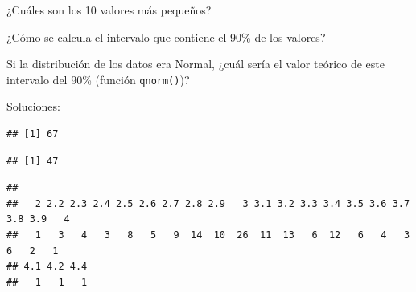 \documentclass[
]{book}
\newenvironment{Shaded}{\begin{snugshade}}{\end{snugshade}}
\newcommand{\DecValTok}[1]{\textcolor[rgb]{0.00,0.00,0.81}{#1}}
\newcommand{\FloatTok}[1]{\textcolor[rgb]{0.00,0.00,0.81}{#1}}
\newcommand{\KeywordTok}[1]{\textcolor[rgb]{0.13,0.29,0.53}{\textbf{#1}}}
\newcommand{\NormalTok}[1]{#1}
\newcommand{\OperatorTok}[1]{\textcolor[rgb]{0.81,0.36,0.00}{\textbf{#1}}}
\newcommand{\StringTok}[1]{\textcolor[rgb]{0.31,0.60,0.02}{#1}}
\begin{document}
¿Cuáles son los 10 valores más pequeños?

¿Cómo se calcula el intervalo que contiene el 90\% de los valores?

Si la distribución de los datos era Normal, ¿cuál sería el valor teórico de este intervalo del 90\% (función \texttt{qnorm()})?

Soluciones:

\begin{Shaded}
\end{Shaded}

\begin{verbatim}
## [1] 67
\end{verbatim}

\begin{Shaded}
\end{Shaded}

\begin{verbatim}
## [1] 47
\end{verbatim}

\begin{Shaded}
\end{Shaded}

\begin{verbatim}
## 
##   2 2.2 2.3 2.4 2.5 2.6 2.7 2.8 2.9   3 3.1 3.2 3.3 3.4 3.5 3.6 3.7 3.8 3.9   4 
##   1   3   4   3   8   5   9  14  10  26  11  13   6  12   6   4   3   6   2   1 
## 4.1 4.2 4.4 
##   1   1   1
\end{verbatim}

\begin{Shaded}
\end{Shaded}
\end{document}
